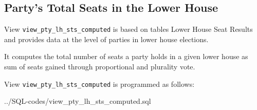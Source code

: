 \subsection{Party's Total Seats in the Lower House}\label{view_pty_lh_sts_computed}
View \texttt{\footnotesize view\_pty\_lh\_sts\_computed} is based on tables Lower House Seat Results and provides data at the level of parties in lower house elections.

It computes the total number of seats a party holds in a given lower house as sum of seats gained through proportional and plurality vote.

View \texttt{\footnotesize view\_pty\_lh\_sts\_computed} is programmed as follows:

%
{../SQL-codes/view_pty_lh_sts_computed.sql}



